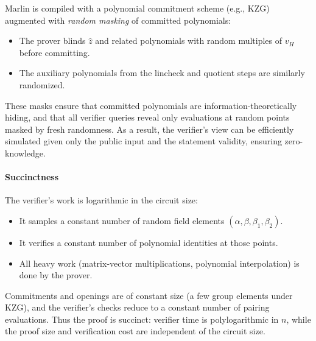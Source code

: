 Marlin is compiled with a polynomial commitment scheme (e.g., KZG) augmented with \emph{random masking} of committed polynomials:
\begin{itemize}
    \item The prover blinds $\hat z$ and related polynomials with random multiples of $v_H$ before committing.
    \item The auxiliary polynomials from the lincheck and quotient steps are similarly randomized.
\end{itemize}
These masks ensure that committed polynomials are information-theoretically hiding, and that all verifier queries reveal only evaluations at random points masked by fresh randomness. As a result, the verifier’s view can be efficiently simulated given only the public input and the statement validity, ensuring zero-knowledge.


\paragraph{Succinctness}

The verifier’s work is logarithmic in the circuit size:
\begin{itemize}
    \item It samples a constant number of random field elements $(\alpha,\beta,\beta_1,\beta_2)$.
    \item It verifies a constant number of polynomial identities at those points.
    \item All heavy work (matrix-vector multiplications, polynomial interpolation) is done by the prover.
\end{itemize}
Commitments and openings are of constant size (a few group elements under KZG), and the verifier’s checks reduce to a constant number of pairing evaluations. Thus the proof is succinct: verifier time is polylogarithmic in $n$, while the proof size and verification cost are independent of the circuit size.





